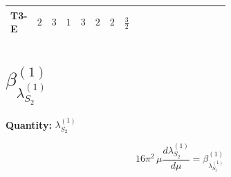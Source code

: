 \documentclass[8pt]{article}
\begin{document}
\begin{landscape}
\begin{longtable}{@{}llcccccc >{\raggedright\arraybackslash}p{0.21\linewidth} >{\raggedright\arraybackslash}p{0.21\linewidth} >{\raggedright\arraybackslash}p{0.21\linewidth}@{}}
T3-E & $2$ & $3$ & $1$ & $3$ & $2$ & $2$ & $\frac{3}{2}$ & \scriptsize\adjustbox{max width=\linewidth}{$\begin{gathered} +8 {\lambda_{12}^{(1)}} {\lambda_{12}^{(\times)}}\end{gathered}$} & \scriptsize\adjustbox{max width=\linewidth}{$\begin{gathered} +6 {\lambda_{12}^{(A)}}^2\end{gathered}$} & \scriptsize\adjustbox{max width=\linewidth}{$\begin{gathered} +6 {\lambda_{12}^{(\times)}}^2\end{gathered}$} \\
\midrule
\bottomrule
\end{longtable}
\clearpage
\section*{$\beta_{\lambda_{S_2}^{(1)}}^{(1)}$}
\noindent\textbf{Quantity: }$\lambda_{S_2}^{(1)}$\par\smallskip
\[16\pi^2\,\mu\frac{d \lambda_{S_2}^{(1)}}{d\mu}=\beta_{\lambda_{S_2}^{(1)}}^{(1)}\]

\end{landscape}
\end{document}
